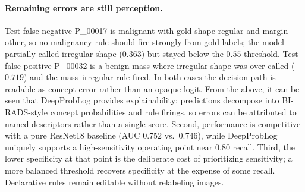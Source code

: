 \paragraph{Remaining errors are still perception.}
Test false negative P\_00017 is malignant with gold shape regular and margin other, so no malignancy rule should fire strongly from gold labels; the model partially called irregular shape ($0.363$) but stayed below the $0.55$ threshold. Test false positive P\_00032 is a benign mass where irregular shape was over-called ($0.719$) and the mass--irregular rule fired. In both cases the decision path is readable as concept error rather than an opaque logit.
From the above, it can be seen that DeepProbLog provides explainability: predictions decompose into BI-RADS-style concept probabilities and rule firings, so errors can be attributed to named descriptors rather than a single score. Second, performance is competitive with a pure ResNet18 baseline (AUC $0.752$ vs.\ $0.746$), while DeepProbLog uniquely supports a high-sensitivity operating point near $0.80$ recall. Third, the lower specificity at that point is the deliberate cost of prioritizing sensitivity; a more balanced threshold recovers specificity at the expense of some recall. Declarative rules remain editable without relabeling images.
